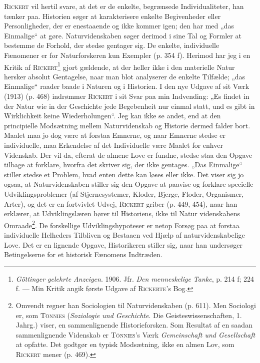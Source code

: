 \documentclass[12pt]{article}
\newcommand{\opage}[1]{\marginnote{\footnotesize\textit{[#1]}}}
\begin{document}
\textsc{Rickert} vil hertil svare, at det er de enkelte, begrænsede
Individualiteter, han tænker paa. Historien søger at karakterisere enkelte
Begivenheder eller Personligheder, der er enestaaende og ikke kommer igen; den har
med „das Einmalige“ at gøre. Naturvidenskaben søger derimod i sine Tal og Formler
at bestemme de Forhold, der stedse gentager sig. %
De enkelte, individuelle Fænomener
er for Naturforskeren kun Exempler (p. 354 f). Herimod har jeg i en Kritik af
\textsc{Rickert}\footnote{\textit{Göttinger gelehrte Anzeigen}. 1906. Jfr.
\textit{Den menneskelige Tanke}, p. 214 f; 224 f. --- Min Kritik angik første
Udgave af
\textsc{Rickerte}'s Bog.} gjort gældende, at der heller ikke i den
materielle Natur hersker absolut Gentagelse, naar man blot analyserer de enkelte
Tilfælde; „das Einmalige“ raader baade i Naturen og i Historien. I den nye Udgave
af sit Værk (1913) (p. 468) indrømmer \textsc{Rickert} i sit Svar paa min
Indvending: „Es findet in der Natur wie in der Geschichte jede Begebenheit nur
einmal statt, und es gibt in Wirklichkeit keine Wiederholungen“. Jeg kan ikke se
andet, end at den principielle Modsætning mellem Naturvidenskab og Historie dermed
falder bort. Maalet maa jo dog være at forstaa Emnerne, og naar Emnerne stedse er
individuelle, maa Erkendelse af det Individuelle være Maalet for enhver
Videnskab. Der vil da, efterat de almene Love er fundne, stedse staa den Opgave
tilbage at forklare, hvorfra det skriver sig, der ikke gentages. „Das Einmalige“
stiller stedse et Problem, hvad enten dette kan løses eller ikke. Det viser sig jo
ogsaa, at Naturvidenskaben stiller sig den Opgave at paavise og forklare
specielle Udviklingsproblemer (af Stjernesystemer, Kloder, Bjerge, Floder,
Organismer, Arter), og det er en fortvivlet Udvej, \textsc{Rickert} griber (p. 449,
454), naar han erklærer, at Udviklingslæren hører til Historiens, ikke til Natur%
\setcounter{footnote}{0}%
\opage{66}videnskabens Omraade\footnote{Omvendt regner han Sociologien til
Naturvidenskaben (p. 611). Men Sociologi er, som \textsc{Tönnies}
(\textit{Soziologie und Geschichte}. Die Geisteswissenschaften, 1. Jahrg.) viser,
en sammenlignende Historieforsken. Som Resultat af en saadan sammenlignende
Videnskab er \textsc{Tönnies}'s Værk \textit{Gemeinschaft und Gesellschaft} at
opfatte. Det godtgør en typisk Modsætning, ikke en almen Lov, som \textsc{Rickert}
mener (p. 469).}. De forskellige Udviklingshypoteser er netop Forsøg paa at forstaa
individuelle Helheders Tilbliven og Bestaaen ved Hjælp af naturvidenskabelige Love.
Det er en lignende Opgave, Historikeren stiller sig, naar han undersøger
Betingelserne for et historisk Fænomens Indtræden.
\end{document}
